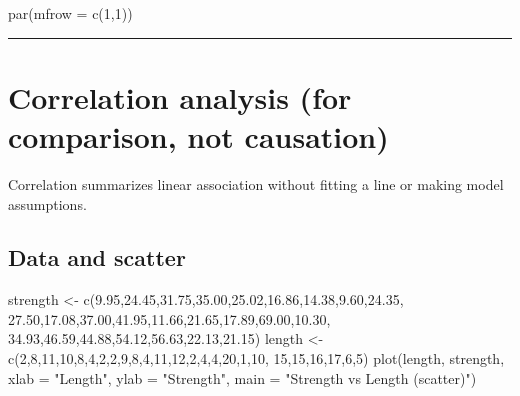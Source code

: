 \documentclass[
  letterpaper,
  DIV=11,
  numbers=noendperiod]{scrreprt}
\newenvironment{Shaded}{\begin{snugshade}}{\end{snugshade}}
\newcommand{\AttributeTok}[1]{\textcolor[rgb]{0.40,0.45,0.13}{#1}}
\newcommand{\DecValTok}[1]{\textcolor[rgb]{0.68,0.00,0.00}{#1}}
\newcommand{\FloatTok}[1]{\textcolor[rgb]{0.68,0.00,0.00}{#1}}
\newcommand{\FunctionTok}[1]{\textcolor[rgb]{0.28,0.35,0.67}{#1}}
\newcommand{\NormalTok}[1]{\textcolor[rgb]{0.00,0.23,0.31}{#1}}
\newcommand{\OtherTok}[1]{\textcolor[rgb]{0.00,0.23,0.31}{#1}}
\newcommand{\StringTok}[1]{\textcolor[rgb]{0.13,0.47,0.30}{#1}}
\begin{document}
\begin{Shaded}
\begin{Highlighting}[]
\FunctionTok{par}\NormalTok{(}\AttributeTok{mfrow =} \FunctionTok{c}\NormalTok{(}\DecValTok{1}\NormalTok{,}\DecValTok{1}\NormalTok{))}
\end{Highlighting}
\end{Shaded}

\begin{center}\rule{0.5\linewidth}{0.5pt}\end{center}

\section{Correlation analysis (for comparison, not
causation)}\label{correlation-analysis-for-comparison-not-causation}

Correlation summarizes linear association without fitting a line or
making model assumptions.

\subsection{Data and scatter}\label{data-and-scatter}

\begin{Shaded}
\begin{Highlighting}[]
\NormalTok{strength }\OtherTok{\textless{}{-}} \FunctionTok{c}\NormalTok{(}\FloatTok{9.95}\NormalTok{,}\FloatTok{24.45}\NormalTok{,}\FloatTok{31.75}\NormalTok{,}\FloatTok{35.00}\NormalTok{,}\FloatTok{25.02}\NormalTok{,}\FloatTok{16.86}\NormalTok{,}\FloatTok{14.38}\NormalTok{,}\FloatTok{9.60}\NormalTok{,}\FloatTok{24.35}\NormalTok{,}
              \FloatTok{27.50}\NormalTok{,}\FloatTok{17.08}\NormalTok{,}\FloatTok{37.00}\NormalTok{,}\FloatTok{41.95}\NormalTok{,}\FloatTok{11.66}\NormalTok{,}\FloatTok{21.65}\NormalTok{,}\FloatTok{17.89}\NormalTok{,}\FloatTok{69.00}\NormalTok{,}\FloatTok{10.30}\NormalTok{,}
              \FloatTok{34.93}\NormalTok{,}\FloatTok{46.59}\NormalTok{,}\FloatTok{44.88}\NormalTok{,}\FloatTok{54.12}\NormalTok{,}\FloatTok{56.63}\NormalTok{,}\FloatTok{22.13}\NormalTok{,}\FloatTok{21.15}\NormalTok{)}
\NormalTok{length }\OtherTok{\textless{}{-}} \FunctionTok{c}\NormalTok{(}\DecValTok{2}\NormalTok{,}\DecValTok{8}\NormalTok{,}\DecValTok{11}\NormalTok{,}\DecValTok{10}\NormalTok{,}\DecValTok{8}\NormalTok{,}\DecValTok{4}\NormalTok{,}\DecValTok{2}\NormalTok{,}\DecValTok{2}\NormalTok{,}\DecValTok{9}\NormalTok{,}\DecValTok{8}\NormalTok{,}\DecValTok{4}\NormalTok{,}\DecValTok{11}\NormalTok{,}\DecValTok{12}\NormalTok{,}\DecValTok{2}\NormalTok{,}\DecValTok{4}\NormalTok{,}\DecValTok{4}\NormalTok{,}\DecValTok{20}\NormalTok{,}\DecValTok{1}\NormalTok{,}\DecValTok{10}\NormalTok{,}
            \DecValTok{15}\NormalTok{,}\DecValTok{15}\NormalTok{,}\DecValTok{16}\NormalTok{,}\DecValTok{17}\NormalTok{,}\DecValTok{6}\NormalTok{,}\DecValTok{5}\NormalTok{)}
\FunctionTok{plot}\NormalTok{(length, strength, }\AttributeTok{xlab =} \StringTok{"Length"}\NormalTok{, }\AttributeTok{ylab =} \StringTok{"Strength"}\NormalTok{,}
     \AttributeTok{main =} \StringTok{"Strength vs Length (scatter)"}\NormalTok{)}
\end{Highlighting}
\end{Shaded}
\end{document}
